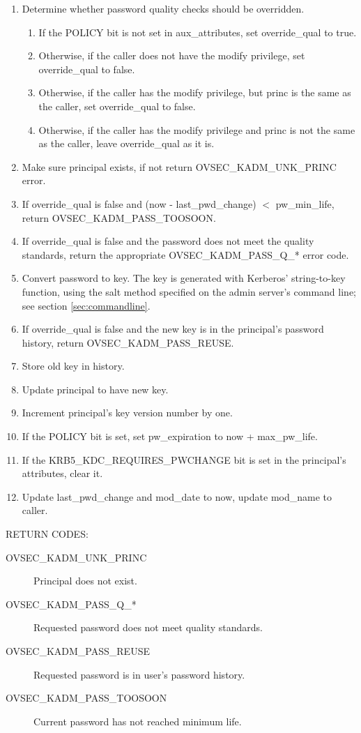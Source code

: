 \begin{enumerate}
\item Determine whether password quality checks should be overridden.
\begin{enumerate}
\item If the POLICY bit is not set in aux_attributes, set
override_qual to true.
\item Otherwise, if the caller does not have the modify privilege,
set override_qual to false.
\item Otherwise, if the caller has the modify privilege, but princ is the
same as the caller, set override_qual to false.
\item Otherwise, if the caller has the modify privilege and princ is
not the same as the caller, leave override_qual as it is.
\end{enumerate}
\item Make sure principal exists, if not return OVSEC_KADM_UNK_PRINC error.
\item If override_qual is false and (now - last_pwd_change) $<$
pw_min_life, return OVSEC_KADM_PASS_TOOSOON.
\item If override_qual is false and the password does not meet the quality
standards, return the appropriate OVSEC_KADM_PASS_Q_* error code.
\item Convert password to key.  The key is generated with
Kerberos' string-to-key function, using the salt method specified on
the admin server's command line; see section \ref{sec:commandline}.
\item If override_qual is false and the new key is in the principal's
password history, return OVSEC_KADM_PASS_REUSE.
\item Store old key in history.
\item Update principal to have new key.
\item Increment principal's key version number by one.
\item If the POLICY bit is set, set pw_expiration to now + max_pw_life.
\item If the KRB5_KDC_REQUIRES_PWCHANGE bit is set in the principal's
attributes, clear it.
\item Update last_pwd_change and mod_date to now, update mod_name to
caller.
\end{enumerate}

RETURN CODES:

\begin{description}
\item[OVSEC_KADM_UNK_PRINC] Principal does not exist.
\item[OVSEC_KADM_PASS_Q_*] Requested password does not meet quality
standards. 
\item[OVSEC_KADM_PASS_REUSE] Requested password is in user's
password history. 
\item[OVSEC_KADM_PASS_TOOSOON] Current password has not reached minimum
life. 
\end{description}


